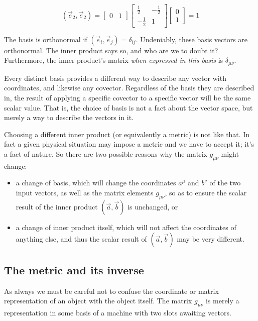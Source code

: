 $$
(\vec{e}_2, \vec{e}_2) =
\begin{bmatrix}
0 & 1
\end{bmatrix}
\begin{bmatrix}
\frac{1}{2} & -\frac{1}{2} \\
-\frac{1}{2} & 1
\end{bmatrix}
\begin{bmatrix}
0 \\ 1
\end{bmatrix}
= 1
$$    

The basis is orthonormal if $(\vec{e}_i, \vec{e}_j) = \delta_{ij}$. Undeniably, these basis vectors are orthonormal. The inner product says so, and who are we to doubt it? Furthermore, the inner product's matrix \textit{when expressed in this basis} is $\delta_{\mu\nu}$.

Every distinct basis provides a different way to describe any vector with coordinates, and likewise any covector. Regardless of the basis they are described in, the result of applying a specific covector to a specific vector will be the same scalar value. That is, the choice of basis is not a fact about the vector space, but merely a way to describe the vectors in it.

Choosing a different inner product (or equivalently a metric) is not like that. In fact a given physical situation may impose a metric and we have to accept it; it's a fact of nature. So there are two possible reasons why the matrix $g_{\mu\nu}$ might change:

\begin{itemize}
    \item a change of basis, which will change the coordinates $a^{\mu}$ and $b^{\nu}$ of the two input vectors, as well as the matrix elements $g_{\mu\nu}$, so as to ensure the scalar result of the inner product $(\vec{a}, \vec{b})$ is unchanged, or
    \item a change of inner product itself, which will not affect the coordinates of anything else, and thus the scalar result of $(\vec{a}, \vec{b})$ may be very different.
\end{itemize}

\subsection{The metric and its inverse}

As always we must be careful not to confuse the coordinate or matrix representation of an object with the object itself. The matrix $g_{\mu\nu}$ is merely a representation in some basis of a machine with two slots awaiting vectors. 

